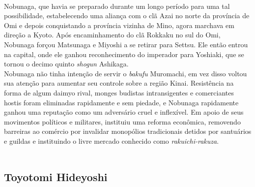 \documentclass[12pt, a4paper]{article}
\begin{document}
            \\
            \indent Nobunaga, que havia se preparado durante um longo período para uma tal possibilidade, estabelecendo uma aliança com o clã Azai no norte da província de Omi e depois conquistando a província vizinha de Mino, agora marchava em direção a Kyoto. Após encaminhamento do clã Rokkaku no sul do Omi, Nobunaga forçou Matsunaga e Miyoshi a se retirar para Settsu. Ele então entrou na capital, onde ele ganhou reconhecimento do imperador para Yoshiaki, que se tornou o decimo quinto \textit{shogun} Ashikaga.\\
            \indent Nobunaga não tinha intenção de servir o \textit{bakufu} Muromachi, em vez disso voltou sua atenção para aumentar seu controle sobre a região Kinai. Resistência na forma de algum daimyo rival, monges budistas intransigentes e comerciantes hostis foram eliminadas rapidamente e sem piedade, e Nobunaga rapidamente ganhou uma reputação como um adversário cruel e inflexível. Em apoio de seus movimentos políticos e militares, instituiu uma reforma econômica, removendo barreiras ao comércio por invalidar monopólios tradicionais detidos por santuários e guildas e instituindo o livre mercado conhecido como \textit{rakuichi-rakuza}.\\
            \\



            
        \subsection {Toyotomi Hideyoshi}
            
\end{document}
